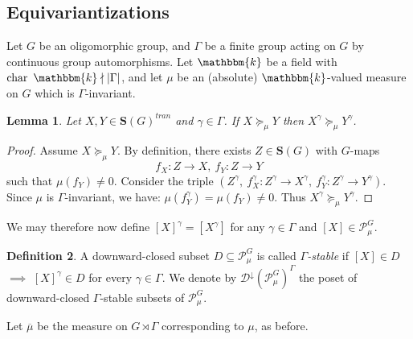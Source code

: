 \documentclass[11pt,a4paper]{amsart}
\theoremstyle{plain}%
\newtheorem{lemma}{Lemma}[subsection]
\theoremstyle{definition}
\newtheorem{definition}[lemma]{Definition}
\theoremstyle{remark}
\newcommand{\kk}{\mathbbm{k}}
\newcommand{\Down}{\mathcal{D}^{\downarrow}}
\newcommand{\Set}[1]{\mathbf{S}(#1)}
\begin{document}


\subsection{Equivariantizations}\label{subsec:ideals_equivariantization}
Let $G$ be an oligomorphic group, and $\Gamma$ be a finite group acting on $G$ by continuous group automorphisms. Let $\kk$ be a field with $\operatorname{char} ~\kk \nmid |\Gamma|$, and let $\mu$ be an (absolute) $\kk$-valued measure on $G$ which is $\Gamma$-invariant.

    \begin{lemma}\label{lem:twist-order}
    Let $X, Y\in \Set{G}^{tran}$ and $\gamma\in \Gamma$. If $X\succeq_{\mu} Y$ then $X^{\gamma}\succeq_{\mu} Y^{\gamma}$. 
    \end{lemma}
    \begin{proof}
        Assume $X\succeq_{\mu} Y$. By definition, there exists $Z\in \Set{G}$ with $G$-maps $$f_X:Z\to X, ~f_Y:Z\to Y$$ such that $\mu(f_Y)\neq0$. Consider the triple $(Z^{\gamma}, ~f_X^{\gamma}:Z^{\gamma}\to X^{\gamma}, ~f_Y^{\gamma}:Z^{\gamma}\to Y^{\gamma})$. Since $\mu$ is $\Gamma$-invariant, we have: $\mu(f_Y^{\gamma})=\mu(f_Y)\neq 0$. Thus $X^{\gamma}\succeq_{\mu} Y^{\gamma}$. 
    \end{proof}
    We may therefore now define $[X]^{\gamma}=[X^{\gamma}]$ for any $\gamma\in \Gamma$ and $[X]\in \mathcal{P}_{\mu}^G$.
    \begin{definition}
        A downward-closed subset $D\subseteq \mathcal{P}^G_\mu $ is called \emph{$\Gamma$-stable} if $[X]\in D$ $\implies$ $[X]^\gamma\in D$ for every $\gamma\in \Gamma$. We denote by $\Down(\mathcal{P}^G_\mu)^{\Gamma}$ the poset of downward-closed $\Gamma$-stable subsets of $ \mathcal{P}^G_\mu $.
    \end{definition}

   Let $\overline{\mu}$ be the measure on $G\rtimes \Gamma$ corresponding to $\mu$, as before. 
\end{document}
